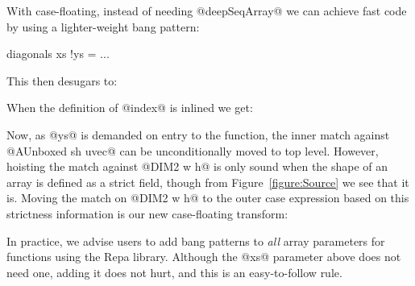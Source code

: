 \eject
With case-floating, instead of needing @deepSeqArray@ we can achieve fast code by using a lighter-weight bang pattern:
\par
\begin{small}
\begin{code}
  diagonals xs !ys = ...
\end{code}
\end{small}
%
This then desugars to:
%
\begin{small}
\end{small}
%
When the definition of @index@ is inlined we get:
%
\begin{small}
\end{small}
%
Now, as @ys@ is demanded on entry to the function, the inner match against @AUnboxed sh uvec@ can be unconditionally moved to top level. However, hoisting the match against @DIM2 w h@ is only sound when the shape of an array is defined as a strict field, though from Figure~\ref{figure:Source} we see that it is. Moving the match on @DIM2 w h@ to the outer case expression based on this strictness information is our new case-floating transform: 
%
\begin{small}
\end{small}
%
In practice, we advise users to add bang patterns to \emph{all} array parameters for functions using the Repa library. Although the @xs@ parameter above does not need one, adding it does not hurt, and this is an easy-to-follow rule. 

